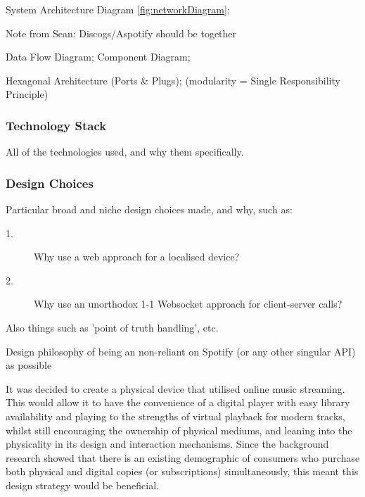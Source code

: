             \begin{temp}
                System Architecture Diagram \ref{fig:networkDiagram};
                \begin{temp}Note from Sean: Discogs/Aspotify should be together\end{temp}
                
                Data Flow Diagram; Component Diagram;
    
                Hexagonal Architecture (Ports & Plugs); (modularity = Single Responsibility Principle)
            \end{temp}
        
            \subsubsection{Technology Stack}
    
                \begin{temp}
                    All of the technologies used, and why them specifically.
                \end{temp}
        
            \subsubsection{Design Choices}
                \begin{temp}
                    Particular broad and niche design choices made, and why, such as:
                    \begin{description}
                        \item[1.] Why use a web approach for a localised device?
                        \item[2.] Why use an unorthodox 1-1 Websocket approach for client-server calls?
                    \end{description}
                    Also things such as 'point of truth handling', etc.
                    
                    Design philosophy of being an non-reliant on Spotify (or any other singular API) as possible
                \end{temp}
    
                It was decided to create a physical device that utilised online music streaming. This would allow it to have the convenience of a digital player with easy library availability and playing to the strengths of virtual playback for modern tracks, whilst still encouraging the ownership of physical mediums, and leaning into the physicality in its design and interaction mechanisms. Since the background research showed that there is an existing demographic of consumers who purchase both physical and digital copies (or subscriptions) simultaneously, this meant this design strategy would be beneficial. 
    
